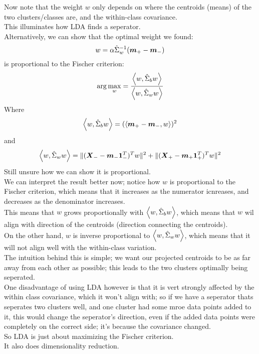 \documentclass[12pt]{article}
\begin{document}
Now note that the weight $w$
only depends on where the centroids (means)
of the two clusters/classes are, and the within-class
covariance. \\
This illuminates how LDA finds a seperator. \\

Alternatively, we can show that the optimal weight we found:
\[ w = \alpha \hat{\Sigma}^{-1}_w (\boldsymbol{m}_+ - \boldsymbol{m}_-) \]
is proportional to the Fischer criterion:
\[ \arg \max_w = \dfrac{\left\langle w, \hat{\Sigma}_b w \right\rangle}
{\left\langle w, \hat{\Sigma}_w w \right\rangle} \]
Where
\[ \left\langle w, \hat{\Sigma}_b w \right\rangle = (\left\langle \boldsymbol{m}_+ - \boldsymbol{m}_-, w \right\rangle)^2 \]
and
\[ \left\langle w, \hat{\Sigma}_w w \right\rangle = 
\|(\boldsymbol{X}_- - \boldsymbol{m}_-\boldsymbol{1}^T_-)^Tw\|^2
+ \|(\boldsymbol{X}_+ - \boldsymbol{m}_+\boldsymbol{1}^T_+)^Tw\|^2 \]
Still unsure how we can show it is proportional. \\

We can interpret the result better now;
notice how $w$ is proportional to the Fischer
criterion, which means that it increases as the numerator 
icnreases, and decreases as the denominator increases. \\
This means that $w$ grows proportionally with
$\left\langle w, \hat{\Sigma}_b w \right\rangle$,
which means that $w$ wil align with direction of
the centroids (direction connecting the centroids). \\
On the other hand, $w$ is inverse proportional to 
$\left\langle w, \hat{\Sigma}_w w \right\rangle$,
which means that it will not align well with the 
within-class variation. \\

The intuition behind this is simple;
we want our projected centroids to be as far
away from each other as possible;
this leads to the two clusters optimally
being seperated. \\

One disadvantage of using LDA however is that it is
vert strongly affected by the within class
covariance, which it won't align with;
so if we have a seperator thats seperates two clusters
well, and one cluster had some mroe data points added to it,
this would change the seperator's direction, even if
the added data points were completely on the correct
side; it's because the covariance changed. \\

So LDA is just about maximizing the Fischer criterion. \\

It also does dimensionality reduction. \\

\newpage
\end{document}
